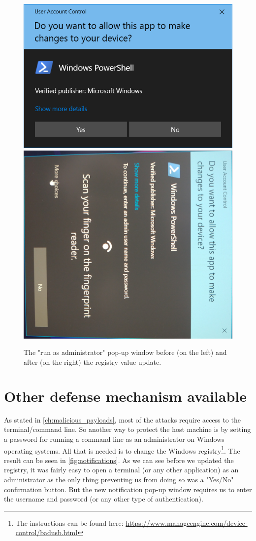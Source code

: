 \begin{figure}[ht]
    \centering
    \includegraphics[width=0.4\linewidth]{./obrazky-figures/basic_notification.PNG}
    \includegraphics[width=0.4\linewidth]{./obrazky-figures/notification_with_authentication.jpg}
    \caption{The "run as administrator" pop-up window before (on the left) and after (on the right) the registry value update.}
    \label{fig:notifications}
\end{figure}

\section{Other defense mechanism available}
\label{sec:defense_other_strategies}
As stated in \autoref{ch:malicious_payloads}, most of the attacks require access to the terminal/command line. So another way to protect the host machine is by setting a password for running a command line as an administrator on Windows operating systems. All that is needed is to change the Windows registry\footnote{The instructions can be found here: \url{https://www.manageengine.com/device-control/badusb.html}}. The result can be seen in \autoref{fig:notifications}. As we can see before we updated the registry, it was fairly easy to open a terminal (or any other application) as an administrator as the only thing preventing us from doing so was a "Yes/No" confirmation button. But the new notification pop-up window requires us to enter the username and password (or any other type of authentication).

